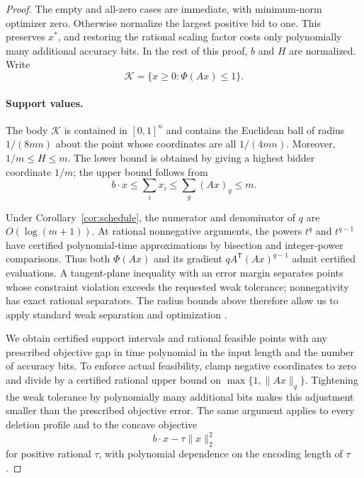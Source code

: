 \documentclass[11pt]{article}
\begin{document}
\begin{proof}
The empty and all-zero cases are immediate, with minimum-norm
optimizer zero.
Otherwise normalize the largest positive bid to one.
This preserves $x^*$, and restoring the rational scaling factor
costs only polynomially many additional accuracy bits.
In the rest of this proof, $b$ and $H$ are normalized.
Write
\[
\mathcal K=\{x\ge0:\Phi(Ax)\le1\}.
\]

\paragraph{Support values.}
The body $\mathcal K$ is contained in $[0,1]^n$ and contains
the Euclidean ball of radius $1/(8mn)$ about the point whose
coordinates are all $1/(4mn)$.
Moreover, $1/m\le H\le m$.
The lower bound is obtained by giving a highest bidder
coordinate $1/m$; the upper bound follows from
\[
b\cdot x
\le\sum_i x_i
\le\sum_g(Ax)_g
\le m.
\]

Under Corollary~\ref{cor:schedule}, the numerator and denominator
of $q$ are $O(\log(m+1))$.
At rational nonnegative arguments, the powers $t^q$ and
$t^{q-1}$ have certified polynomial-time approximations by
bisection and integer-power comparisons.
Thus both $\Phi(Ax)$ and its gradient
$qA^{\mathsf T}(Ax)^{q-1}$ admit certified evaluations.
A tangent-plane inequality with an error margin separates
points whose constraint violation exceeds the requested weak
tolerance; nonnegativity has exact rational separators.
The radius bounds above therefore allow us to apply standard
weak separation and optimization
\cite[Chapters~3--5]{compGLS1993}.

We obtain certified support intervals and rational feasible
points with any prescribed objective gap in time polynomial
in the input length and the number of accuracy bits.
To enforce actual feasibility, clamp negative coordinates
to zero and divide by a certified rational upper bound on
$\max\{1,\|Ax\|_q\}$.
Tightening the weak tolerance by polynomially many additional
bits makes this adjustment smaller than the prescribed
objective error.
The same argument applies to every deletion profile and to
the concave objective
\[
b\cdot x-\tau\|x\|_2^2
\]
for positive rational $\tau$, with polynomial dependence on
the encoding length of $\tau$.


\end{proof}
\end{document}
